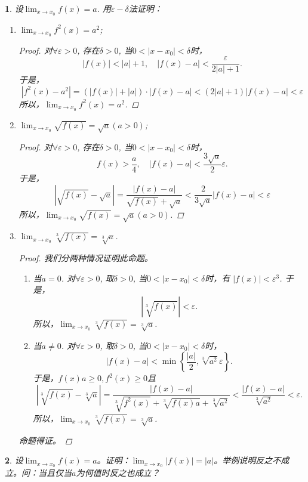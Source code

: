 \documentclass[utf8]{book}
\newtheorem{example}{}[section]             %
\begin{document}
\begin{example}
设$\displaystyle\lim_{x\to x_0}f(x) =a$. 用$\varepsilon-\delta$法证明：
\renewcommand\labelenumi{\normalfont(\theenumi)}
\begin{enumerate}
\item $\displaystyle\lim_{x\to x_0}f^2(x)=a^2$;
\begin{proof}对$\forall \varepsilon > 0$, 存在$\delta > 0$, 当$0<|x-x_0| < \delta$时， $$|f(x)| < |a|+ 1, \quad|f(x)- a| < \frac{\varepsilon}{2|a|+1}.$$
于是，
$$\left|f^2(x) - a^2\right| = (|f(x)| + |a|)\cdot\left|f(x) - a\right|< (2|a|+1)\left|f(x) - a\right| < \varepsilon$$
所以，$\displaystyle\lim_{x\to x_0}f^2(x)=a^2$.
\end{proof}
\item $\displaystyle\lim_{x\to x_0}\sqrt{f(x)}=\sqrt{a}(a > 0)$;
\begin{proof}
对$\forall \varepsilon > 0$, 存在$\delta > 0$, 当$0<|x-x_0| < \delta$时，
$$f(x) > \frac{a}{4}, \quad |f(x) - a|<\frac{3\sqrt{a}}{2}\varepsilon.$$
于是，
$$\left|\sqrt{f(x)}-\sqrt{a}\right| = \frac{\left|f(x)-a\right|}{\sqrt{f(x)}+\sqrt{a}} < \frac{2}{3\sqrt{a}}\left|f(x)-a\right| < \varepsilon$$
所以，$\displaystyle\lim_{x\to x_0}\sqrt{f(x)}=\sqrt{a}(a > 0)$.
\end{proof}
\item $\displaystyle\lim_{x\to x_0}\sqrt[3]{f(x)}=\sqrt[3]{a}$.
\begin{proof}我们分两种情况证明此命题。
\renewcommand\labelenumi{\normalfont(\theenumi)}
\begin{enumerate}
\item 当$a=0$. 对$\forall \varepsilon > 0$, 取$\delta > 0$, 当$0 < |x-x_0| < \delta$时，有 $|f(x)| < \varepsilon^3$.
于是，$$\left|\sqrt[3]{f(x)}\right| < \varepsilon.$$
所以，$\displaystyle\lim_{x\to x_0}\sqrt[3]{f(x)}=\sqrt[3]{a}$.
\item 当$a\neq 0$. 对$\forall \varepsilon > 0$, 取$\delta > 0$, 当$0 < |x-x_0| < \delta$时，
$$|f(x) -a| < \min\left\{\frac{|a|}{2}, \sqrt[3]{a^2}\varepsilon\right\}.$$
于是，$f(x)a \geq 0, f^2(x)\geq 0$且
$$\left|\sqrt[3]{f(x)}-\sqrt[3]{a}\right|=\frac{|f(x)-a|}{\sqrt[3]{f^2(x)} + \sqrt[3]{f(x)a}+\sqrt[3]{a^2}}<\frac{|f(x)-a|}{\sqrt[3]{a^2}}<\varepsilon.$$
所以，$\displaystyle\lim_{x\to x_0}\sqrt[3]{f(x)}=\sqrt[3]{a}$.
\end{enumerate}
命题得证。
\end{proof}
\end{enumerate}
\end{example}
\begin{example}
设$\displaystyle\lim_{x\to x_0}f(x)=a$。证明：$\displaystyle\lim_{x\to x_0}|f(x)|=|a|$。举例说明反之不成立。问：当且仅当$a$为何值时反之也成立？
\end{example}
\end{document}
